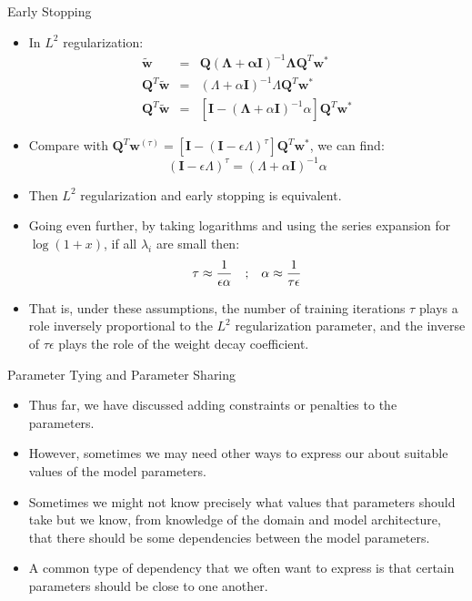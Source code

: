 \documentclass[10pt]{beamer}
\begin{document}
	\begin{frame}{Early Stopping}
		\begin{itemize}
			\item In $L^2$ regularization:
			\begin{eqnarray}
				\tilde{\bm{w}}&=&\bm{Q}(\bm{\Lambda+\alpha\bm{I}})^{-1}\bm{\Lambda Q}^T\bm{w}^*\\
				\bm{Q}^T\tilde{\bm{w}}&=&(\Lambda+\alpha\bm{I})^{-1}\Lambda\bm{Q}^T\bm{w}^*\\
				\bm{Q}^T\tilde{\bm{w}}&=&\left[\bm{I}-(\bm{\Lambda}+\alpha\bm{I})^{-1}\alpha\right]\bm{Q}^T\bm{w}^*
			\end{eqnarray}
			
			\pause
			\item Compare with $\bm{Q}^T\bm{w}^{(\tau)}=\left[\bm{I}-(\bm{I}-\epsilon\Lambda)^{\tau}\right]\bm{Q}^T\bm{w}^*$, we can find:
			$$(\bm{I}-\epsilon\Lambda)^\tau=(\Lambda+\alpha\bm{I})^{-1}\alpha$$
			
			\pause
			\item Then $L^2$ regularization and early stopping is equivalent. 
			\pause
			\item Going even further, by taking logarithms and using the series expansion for $\log(1+x)$, if all $\lambda_i$ are small then:
			\begin{eqnarray}
				\tau\approx\frac{1}{\epsilon\alpha}\text{\quad;\quad}\alpha\approx\frac{1}{\tau\epsilon}
			\end{eqnarray}
			
			\pause
			\item That is, under these assumptions, the number of training iterations $\tau$ plays a role inversely proportional to the $L^2$ regularization parameter, and the inverse of $\tau\epsilon$ plays the role of the weight decay coefficient.
		\end{itemize}
	\end{frame}
	
	\begin{frame}{Parameter Tying and Parameter Sharing}
		\begin{itemize}
			\pause
			\item Thus far, we have discussed adding constraints or penalties to the parameters.
			\pause
			\item However, sometimes we may need other ways to express our  about suitable values of the model parameters.
			\pause
			\item Sometimes we might not know precisely what values that parameters should take but we know, from knowledge of the domain and model architecture, that there should be some dependencies between the model parameters.
			\pause
			\item A common type of dependency that we often want to express is that certain parameters should be close to one another.
		\end{itemize}
	\end{frame}
	
\end{document}
